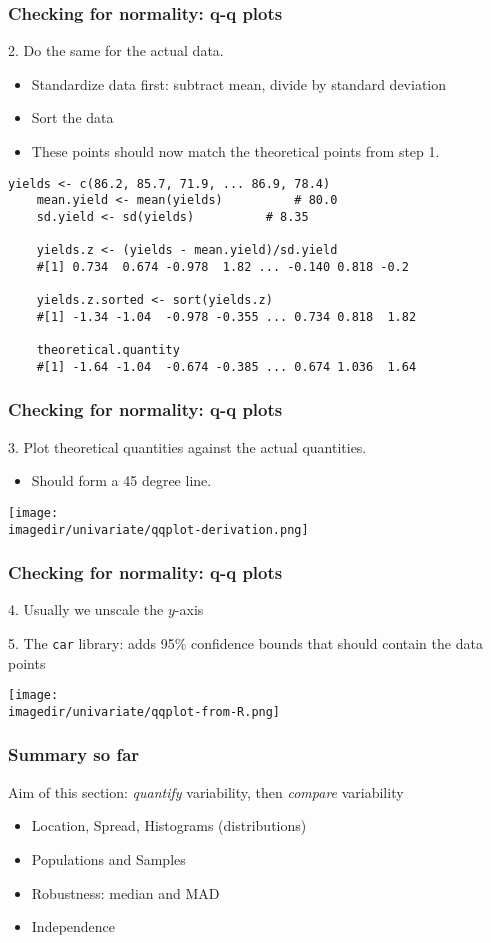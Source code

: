 \begin{frame}[fragile]\frametitle{Checking for normality: q-q plots}
	2. Do the same for the actual data.
	\begin{itemize}
		\item	Standardize data first: subtract mean, divide by standard deviation
		\item	Sort the data
		\item	These points should now match the theoretical points from step 1. 	\end{itemize}
	
	\begin{lstlisting}[R]
	yields <- c(86.2, 85.7, 71.9, ... 86.9, 78.4)
	mean.yield <- mean(yields)          # 80.0
	sd.yield <- sd(yields)		    # 8.35

	yields.z <- (yields - mean.yield)/sd.yield
	#[1] 0.734  0.674 -0.978  1.82 ... -0.140 0.818 -0.2

	yields.z.sorted <- sort(yields.z)
	#[1] -1.34 -1.04  -0.978 -0.355 ... 0.734 0.818  1.82

	theoretical.quantity  
	#[1] -1.64 -1.04  -0.674 -0.385 ... 0.674 1.036  1.64
	\end{lstlisting}
\end{frame}

\begin{frame}\frametitle{Checking for normality: q-q plots}

	3. Plot theoretical quantities against the actual quantities.
	\begin{itemize}
		\item	Should form a 45 degree line.
	\end{itemize}
	\begin{center}
		\texttt{[image: \\imagedir/univariate/qqplot-derivation.png]}
	\end{center}
\end{frame}

\begin{frame}\frametitle{Checking for normality: q-q plots}

	4. Usually we unscale the $y$-axis

	5. The \texttt{car} library: adds 95\% confidence bounds that should contain the data points
	\begin{center}
		\texttt{[image: \\imagedir/univariate/qqplot-from-R.png]}
	\end{center}
\end{frame}

\begin{frame}\frametitle{Summary so far}

	Aim of this section: \emph{quantify} variability, then \emph{compare} variability
	\begin{itemize}
		\item	Location, Spread, Histograms (distributions)
		\item	Populations and Samples
		\item	Robustness: median and MAD
		\item	Independence
	\end{itemize}
\end{frame}

